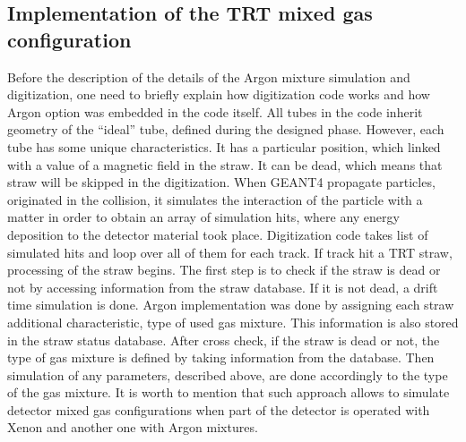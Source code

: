 \subsection{Implementation of the TRT mixed gas configuration}
Before the description of the details of the Argon mixture simulation and digitization, one need to briefly explain how digitization code works and how Argon option was embedded in the code itself.
All tubes in the code inherit geometry of the ``ideal'' tube, defined during the designed phase. However, each tube has some unique characteristics. It has a particular position, 
which linked with a value of a magnetic field in the straw. It can be dead, which means that straw will be skipped in the digitization.
When GEANT4 propagate particles, originated in the collision, it simulates the interaction of the particle with a matter in order to obtain an array of simulation hits, where any energy deposition to the 
detector material took place. Digitization code takes list of simulated hits and loop over all of them for each track. If track hit a TRT straw, processing of the straw begins.
The first step is to check if the straw is dead or not by accessing information from the straw database.
If it is not dead, a drift time simulation is done.
Argon implementation was done by assigning each straw additional characteristic, type of used gas mixture. This information is also stored in the straw status database.
After cross check, if the straw is dead or not, the type of gas mixture is defined by taking information from the database.
Then simulation of any parameters, described above, are done accordingly to the type of the gas mixture.
It is worth to mention that such approach allows to simulate detector mixed gas configurations when part of the detector is operated with Xenon and another one with Argon mixtures.

